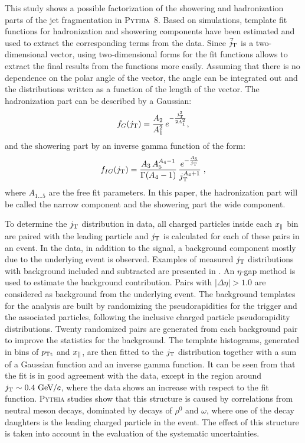 This study shows a possible factorization of the showering and hadronization parts of the jet fragmentation in \textsc{Pythia}~8. Based on simulations, template fit functions for hadronization and showering components have been estimated and used to extract the corresponding terms from the data. Since $\vec{j}_{\rm T}$ is a two-dimensional vector, using two-dimensional forms for the fit functions allows to extract the final results from the functions more easily. Assuming that there is no dependence on the polar angle of the vector, the angle can be integrated out and the distributions written as a function of the length of the vector. The hadronization part can be described by a Gaussian:
\begin{equation}
f_{G}(j_{\rm T}) = \frac{A_{2}}{A_{1}^{2}} \, e^{-\frac{j_{\rm T}^{2}}{2 A_{1}^{2}}},
\label{eq:gauss}
\end{equation}
and the showering part by an inverse gamma function of the form:
\begin{equation}
f_{IG}(j_{\rm T}) = \frac{A_{3} \, A_{5}^{A_{4}-1}}{\Gamma(A_{4}-1)} \, \frac{e^{-\frac{A_{5}}{j_{\rm T}}}}{j_{\rm T}^{A_{4}+1}}\;,
\label{eq:inverseGamma}
\end{equation}  
where $A_{1\ldots5}$ are the free fit parameters. In this paper, the hadronization part will be called the narrow component and the showering part the wide component.
  
To determine the $j_{\rm T}$ distribution in data, all charged particles inside each $x_{\parallel}$ bin are paired with the leading particle and $j_{\rm T}$ is calculated for each of these pairs in an event. In the data, in addition to the signal, a background component mostly due to the underlying event is observed. Examples of measured $j_{\rm T}$ distributions with background included and subtracted are presented in . An $\eta$-gap method is used to estimate the background contribution. Pairs with $|\Delta\eta| > 1.0$ are considered as background from the underlying event. The background templates for the analysis are built by randomizing the pseudorapidities for the trigger and the associated particles, following the inclusive charged particle pseudorapidity distributions. Twenty randomized pairs are generated from each background pair to improve the statistics for the background. The template histograms, generated in bins of $p_{\rm Tt}$ and $x_{\parallel}$, are then fitted to the $j_{\rm T}$ distribution together with a sum of a Gaussian function and an inverse gamma function. It can be seen from  that the fit is in good agreement with the data, except in the region around $j_{\rm T} \sim 0.4~\mathrm{GeV}\kern-0.05em/\kern-0.02em c$, where the data shows an increase with respect to the fit function. \textsc{Pythia} studies show that this structure is caused by correlations from neutral meson decays, dominated by decays of $\rho^{0}$ and $\omega$, where one of the decay daughters is the leading charged particle in the event. The effect of this structure is taken into account in the evaluation of the systematic uncertainties.

